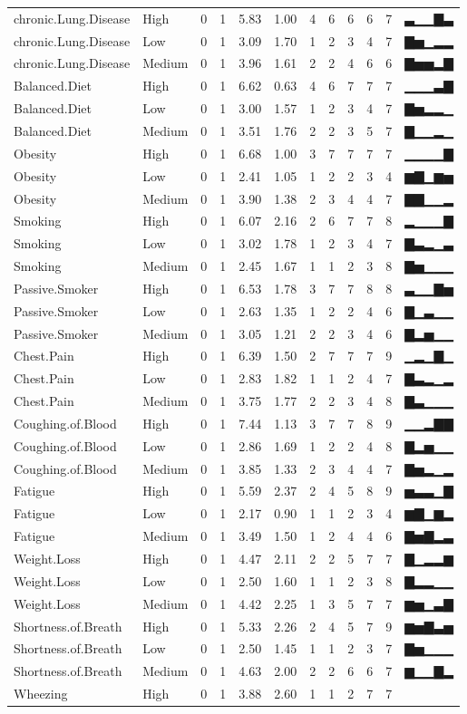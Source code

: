 \documentclass[]{article}
\begin{document}
\begin{longtable}[]{@{}llrrrrrrrrrl@{}}
chronic.Lung.Disease & High & 0 & 1 & 5.83 & 1.00 & 4 & 6 & 6 & 6 & 7 &
▃▁▁▇▃\tabularnewline
chronic.Lung.Disease & Low & 0 & 1 & 3.09 & 1.70 & 1 & 2 & 3 & 4 & 7 &
▇▅▁▂▂\tabularnewline
chronic.Lung.Disease & Medium & 0 & 1 & 3.96 & 1.61 & 2 & 2 & 4 & 6 & 6
& ▇▅▅▂▇\tabularnewline
Balanced.Diet & High & 0 & 1 & 6.62 & 0.63 & 4 & 6 & 7 & 7 & 7 &
▁▁▁▃▇\tabularnewline
Balanced.Diet & Low & 0 & 1 & 3.00 & 1.57 & 1 & 2 & 3 & 4 & 7 &
▇▅▂▂▁\tabularnewline
Balanced.Diet & Medium & 0 & 1 & 3.51 & 1.76 & 2 & 2 & 3 & 5 & 7 &
▇▁▁▂▁\tabularnewline
Obesity & High & 0 & 1 & 6.68 & 1.00 & 3 & 7 & 7 & 7 & 7 &
▁▁▁▁▇\tabularnewline
Obesity & Low & 0 & 1 & 2.41 & 1.05 & 1 & 2 & 2 & 3 & 4 &
▆▇▁▆▅\tabularnewline
Obesity & Medium & 0 & 1 & 3.90 & 1.38 & 2 & 3 & 4 & 4 & 7 &
▇▇▁▁▂\tabularnewline
Smoking & High & 0 & 1 & 6.07 & 2.16 & 2 & 6 & 7 & 7 & 8 &
▂▁▁▁▇\tabularnewline
Smoking & Low & 0 & 1 & 3.02 & 1.78 & 1 & 2 & 3 & 4 & 7 &
▇▃▂▁▃\tabularnewline
Smoking & Medium & 0 & 1 & 2.45 & 1.67 & 1 & 1 & 2 & 3 & 8 &
▇▅▁▁▁\tabularnewline
Passive.Smoker & High & 0 & 1 & 6.53 & 1.78 & 3 & 7 & 7 & 8 & 8 &
▃▁▁▇▅\tabularnewline
Passive.Smoker & Low & 0 & 1 & 2.63 & 1.35 & 1 & 2 & 2 & 4 & 6 &
▇▁▃▁▁\tabularnewline
Passive.Smoker & Medium & 0 & 1 & 3.05 & 1.21 & 2 & 2 & 3 & 4 & 6 &
▇▂▅▁▁\tabularnewline
Chest.Pain & High & 0 & 1 & 6.39 & 1.50 & 2 & 7 & 7 & 7 & 9 &
▁▂▁▇▁\tabularnewline
Chest.Pain & Low & 0 & 1 & 2.83 & 1.82 & 1 & 1 & 2 & 4 & 7 &
▇▃▂▁▂\tabularnewline
Chest.Pain & Medium & 0 & 1 & 3.75 & 1.77 & 2 & 2 & 3 & 4 & 8 &
▇▃▁▁▁\tabularnewline
Coughing.of.Blood & High & 0 & 1 & 7.44 & 1.13 & 3 & 7 & 7 & 8 & 9 &
▁▁▂▇▇\tabularnewline
Coughing.of.Blood & Low & 0 & 1 & 2.86 & 1.69 & 1 & 2 & 2 & 4 & 8 &
▇▂▅▁▁\tabularnewline
Coughing.of.Blood & Medium & 0 & 1 & 3.85 & 1.33 & 2 & 3 & 4 & 4 & 7 &
▇▅▂▁▂\tabularnewline
Fatigue & High & 0 & 1 & 5.59 & 2.37 & 2 & 4 & 5 & 8 & 9 &
▅▃▃▁▇\tabularnewline
Fatigue & Low & 0 & 1 & 2.17 & 0.90 & 1 & 1 & 2 & 3 & 4 &
▆▇▁▆▂\tabularnewline
Fatigue & Medium & 0 & 1 & 3.49 & 1.50 & 1 & 2 & 4 & 4 & 6 &
▇▅▇▂▃\tabularnewline
Weight.Loss & High & 0 & 1 & 4.47 & 2.11 & 2 & 2 & 5 & 7 & 7 &
▇▁▂▂▆\tabularnewline
Weight.Loss & Low & 0 & 1 & 2.50 & 1.60 & 1 & 1 & 2 & 3 & 8 &
▇▂▂▁▁\tabularnewline
Weight.Loss & Medium & 0 & 1 & 4.42 & 2.25 & 1 & 3 & 5 & 7 & 7 &
▆▅▁▃▇\tabularnewline
Shortness.of.Breath & High & 0 & 1 & 5.33 & 2.26 & 2 & 4 & 5 & 7 & 9 &
▆▅▇▃▅\tabularnewline
Shortness.of.Breath & Low & 0 & 1 & 2.50 & 1.45 & 1 & 1 & 2 & 3 & 7 &
▇▅▁▁▁\tabularnewline
Shortness.of.Breath & Medium & 0 & 1 & 4.63 & 2.00 & 2 & 2 & 6 & 6 & 7 &
▆▁▁▇▂\tabularnewline
Wheezing & High & 0 & 1 & 3.88 & 2.60 & 1 & 1 & 2 & 7 & 7 &

\end{longtable}
\end{document}
